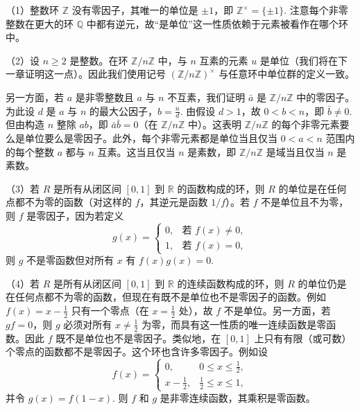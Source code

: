 \begin{example}
（1）整数环 \(\mathbb{Z}\) 没有零因子，其唯一的单位是 \(\pm 1\)，即 \(\mathbb{Z}^\times = \{\pm 1\}\). 注意每个非零整数在更大的环 \(\mathbb{Q}\) 中都有逆元，故“是单位”这一性质依赖于元素被看作在哪个环中。

（2）设 \(n \geq 2\) 是整数。在环 \(\mathbb{Z}/n\mathbb{Z}\) 中，与 \(n\) 互素的元素 \(u\) 是单位（我们将在下一章证明这一点）。因此我们使用记号 \((\mathbb{Z}/n\mathbb{Z})^\times\) 与任意环中单位群的定义一致。

另一方面，若 \(a\) 是非零整数且 \(a\) 与 \(n\) 不互素，我们证明 \(\bar{a}\) 是 \(\mathbb{Z}/n\mathbb{Z}\) 中的零因子。为此设 \(d\) 是 \(a\) 与 \(n\) 的最大公因子，\(b = \frac{n}{d}\). 由假设 \(d > 1\)，故 \(0 < b < n\)，即 \(\bar{b} \neq 0\). 但由构造 \(n\) 整除 \(ab\)，即 \(\bar{a}\bar{b} = 0\)（在 \(\mathbb{Z}/n\mathbb{Z}\) 中）。这表明 \(\mathbb{Z}/n\mathbb{Z}\) 的每个非零元素要么是单位要么是零因子。此外，每个非零元素都是单位当且仅当 \(0 < a < n\) 范围内的每个整数 \(a\) 都与 \(n\) 互素。这当且仅当 \(n\) 是素数，即 \(\mathbb{Z}/n\mathbb{Z}\) 是域当且仅当 \(n\) 是素数。

（3）若 \(R\) 是所有从闭区间 \([0,1]\) 到 \(\mathbb{R}\) 的函数构成的环，则 \(R\) 的单位是在任何点都不为零的函数（对这样的 \(f\)，其逆元是函数 \(1/f\)）。若 \(f\) 不是单位且不为零，则 \(f\) 是零因子，因为若定义
\[
g(x) = \begin{cases} 0, & \text{若 } f(x) \neq 0, \\ 1, & \text{若 } f(x) = 0, \end{cases}
\]
则 \(g\) 不是零函数但对所有 \(x\) 有 \(f(x)g(x) = 0\).

（4）若 \(R\) 是所有从闭区间 \([0,1]\) 到 \(\mathbb{R}\) 的连续函数构成的环，则 \(R\) 的单位仍是在任何点都不为零的函数，但现在有既不是单位也不是零因子的函数。例如 \(f(x) = x - \frac{1}{2}\) 只有一个零点（在 \(x = \frac{1}{2}\) 处），故 \(f\) 不是单位。另一方面，若 \(gf = 0\)，则 \(g\) 必须对所有 \(x \neq \frac{1}{2}\) 为零，而具有这一性质的唯一连续函数是零函数。因此 \(f\) 既不是单位也不是零因子。类似地，在 \([0,1]\) 上只有有限（或可数）个零点的函数都不是零因子。这个环也含许多零因子。例如设
\[
f(x) = \begin{cases} 0, & 0 \leq x \leq \frac{1}{2}, \\ x - \frac{1}{2}, & \frac{1}{2} \leq x \leq 1, \end{cases}
\]
并令 \(g(x) = f(1-x)\). 则 \(f\) 和 \(g\) 是非零连续函数，其乘积是零函数。


\end{example}
